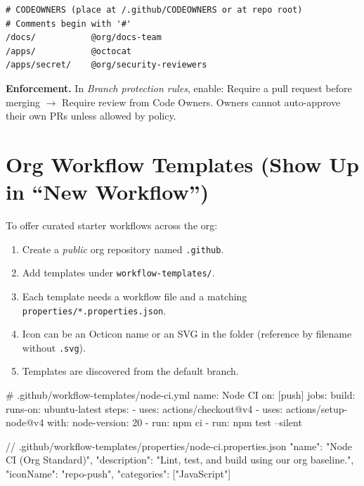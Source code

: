 \documentclass[11pt]{article}
\begin{document}
\begin{verbatim}
# CODEOWNERS (place at /.github/CODEOWNERS or at repo root)
# Comments begin with '#'
/docs/           @org/docs-team
/apps/           @octocat
/apps/secret/    @org/security-reviewers
\end{verbatim}

\begin{tcolorbox}
\textbf{Enforcement.} In \emph{Branch protection rules}, enable: Require a pull request before merging \(\rightarrow\) Require review from Code Owners. Owners cannot auto-approve their own PRs unless allowed by policy.
\end{tcolorbox}
\clearpage

\section{Org Workflow Templates (Show Up in ``New Workflow'')}
To offer curated starter workflows across the org:
\begin{enumerate}
  \item Create a \emph{public} org repository named \texttt{.github}.
  \item Add templates under \texttt{workflow-templates/}.
  \item Each template needs a workflow file and a matching \texttt{properties/*.properties.json}.
  \item Icon can be an Octicon name or an SVG in the folder (reference by filename without \texttt{.svg}).
  \item Templates are discovered from the default branch.
\end{enumerate}

\begin{yamlcode}
# .github/workflow-templates/node-ci.yml
name: Node CI
on: [push]
jobs:
  build:
    runs-on: ubuntu-latest
    steps:
      - uses: actions/checkout@v4
      - uses: actions/setup-node@v4
        with: { node-version: 20 }
      - run: npm ci
      - run: npm test --silent
\end{yamlcode}

\begin{jsoncode}
// .github/workflow-templates/properties/node-ci.properties.json
{
  "name": "Node CI (Org Standard)",
  "description": "Lint, test, and build using our org baseline.",
  "iconName": "repo-push",
  "categories": ["JavaScript"]
}
\end{jsoncode}
\clearpage
\end{document}
